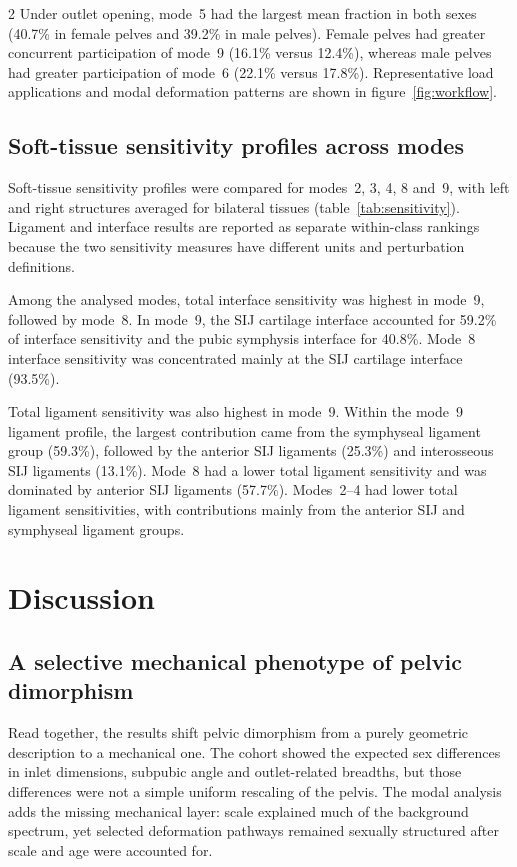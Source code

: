 \documentclass[openacc]{rsproca_new}
\begin{document}
\begin{multicols}{2}
Under outlet opening, mode~5 had the largest mean fraction in both sexes (40.7\% in female pelves and 39.2\% in male pelves). Female pelves had greater concurrent participation of mode~9 (16.1\% versus 12.4\%), whereas male pelves had greater participation of mode~6 (22.1\% versus 17.8\%). Representative load applications and modal deformation patterns are shown in figure~\ref{fig:workflow}.

\subsection{Soft-tissue sensitivity profiles across modes}

Soft-tissue sensitivity profiles were compared for modes~2, 3, 4, 8 and~9, with left and right structures averaged for bilateral tissues (table~\ref{tab:sensitivity}). Ligament and interface results are reported as separate within-class rankings because the two sensitivity measures have different units and perturbation definitions.

Among the analysed modes, total interface sensitivity was highest in mode~9, followed by mode~8. In mode~9, the SIJ cartilage interface accounted for 59.2\% of interface sensitivity and the pubic symphysis interface for 40.8\%. Mode~8 interface sensitivity was concentrated mainly at the SIJ cartilage interface (93.5\%).

Total ligament sensitivity was also highest in mode~9. Within the mode~9 ligament profile, the largest contribution came from the symphyseal ligament group (59.3\%), followed by the anterior SIJ ligaments (25.3\%) and interosseous SIJ ligaments (13.1\%). Mode~8 had a lower total ligament sensitivity and was dominated by anterior SIJ ligaments (57.7\%). Modes~2--4 had lower total ligament sensitivities, with contributions mainly from the anterior SIJ and symphyseal ligament groups.

\section{Discussion}
\subsection{A selective mechanical phenotype of pelvic dimorphism}

Read together, the results shift pelvic dimorphism from a purely geometric description to a mechanical one. The cohort showed the expected sex differences in inlet dimensions, subpubic angle and outlet-related breadths, but those differences were not a simple uniform rescaling of the pelvis. The modal analysis adds the missing mechanical layer: scale explained much of the background spectrum, yet selected deformation pathways remained sexually structured after scale and age were accounted for.


\end{multicols}
\end{document}
